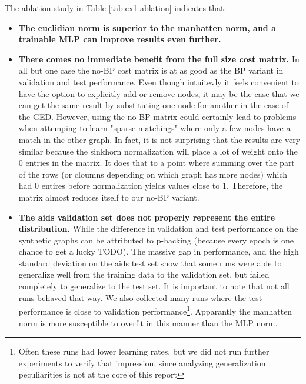 The ablation study in Table \ref{tab:ex1-ablation} indicates that:
\begin{itemize}
    \item \textbf{The euclidian norm is superior to the manhatten norm, and a trainable MLP can improve results even further.}
    \item \textbf{There comes no immediate benefit from the full size cost matrix.} In all but one case the no-BP cost matrix is at as good as the BP variant in validation and test performance. Even though intuitevly it feels convenient to have the option to explicitly add or remove nodes, it may be the case that we can get the same result by substituting one node for another in the case of the GED. However, using the no-BP matrix could certainly lead to problems when attemping to learn "sparse matchings" where only a few nodes have a match in the other graph. In fact, it is not surprising that the results are very similar because the sinkhorn normalization will place a lot of weight onto the 0 entries in the matrix. It does that to a point where summing over the part of the rows (or cloumns depending on which graph has more nodes) which had 0 entires before normalization yields values close to 1. Therefore, the matrix almost reduces itself to our no-BP variant.
    \item \textbf{The aids validation set does not properly represent the entire distribution.} While the difference in validation and test performance on the synthetic graphs can be attributed to p-hacking (because every epoch is one chance to get a lucky TODO). The massive gap in performance, and the high standard deviation on the aids test set show that some runs were able to generalize well from the training data to the validation set, but failed completely to generalize to the test set. It is important to note that not all runs behaved that way. We also collected many runs where the test performance is close to validation performance\footnote{Often these runs had lower learning rates, but we did not run further experiments to verify that impression, since analyzing generalization peculiarities is not at the core of this report}. Apparantly the manhatten norm is more susceptible to overfit in this manner than the MLP norm.
\end{itemize}


